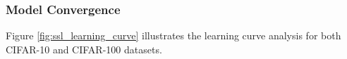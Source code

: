\begin{table}[H]
    \centering
    \caption{Comparison of SSL method performance on CIFAR-10 and CIFAR-100 datasets.}
    \label{tab:selfsup}
\end{table}

\subsubsection{Model Convergence}
Figure \ref{fig:ssl_learning_curve} illustrates the learning curve analysis for both CIFAR-10 and CIFAR-100 datasets.

